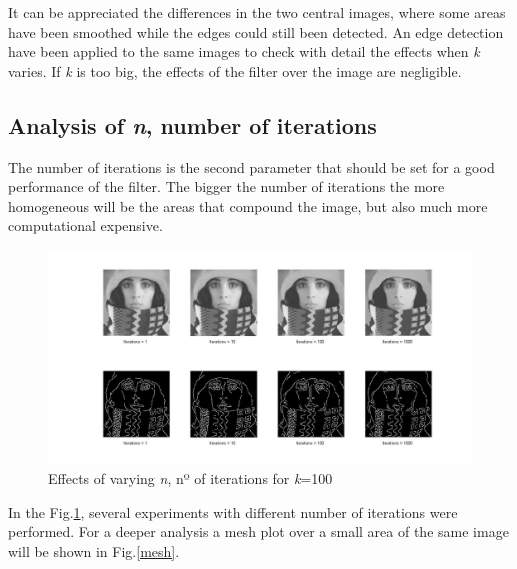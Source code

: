 \documentclass[a4paper, 10pt, conference] {article}
\begin{document}
It can be appreciated the differences in the two central images, where some areas have been smoothed while the edges could still been detected. An edge detection have been applied to the same images to check with detail the effects when \textit{k} varies. If \textit{k} is too big, the effects of the filter over the image are negligible. 

\subsection{Analysis of \textit{n}, number of iterations}
The number of iterations is the second parameter that should be set for a good performance of the filter. The bigger the number of iterations the more homogeneous will be the areas that compound the image, but also much more computational expensive.  
\begin{figure}[H]
	\centering
	\includegraphics[width=1\textwidth]{analysis_trui_it.JPG} %
	\caption{Effects of varying \textit{n}, nº of iterations for \textit{k}=100}
	\label{itanalysis}
\end{figure}
In the Fig.\ref{itanalysis}, several experiments with different number of iterations were performed. For a deeper analysis a mesh plot over a small area of the same image will be shown in Fig.\ref{mesh}.
\end{document}
